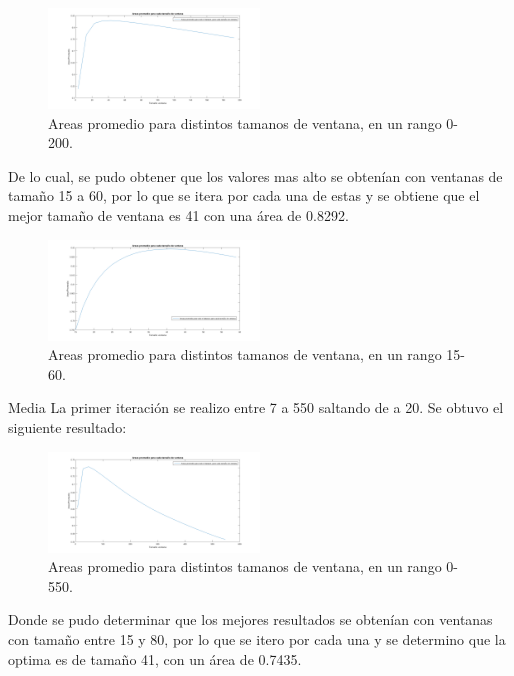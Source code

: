 \begin{figure}[h]
	{
	\centering
	\includegraphics[width=0.50\textwidth]{Figures/MedianaRangoGrande}
	\caption[An Electron]{Areas promedio para distintos tamanos de ventana, en un rango 0-200.}
	}
\end{figure}	

De lo cual, se pudo obtener que los valores mas alto se obtenían con ventanas de tamaño 15 a 60, por lo que se itera por cada una de estas y se obtiene que el mejor tamaño de ventana es 41 con una área de 0.8292.

	\begin{figure}[h]
	{
	\centering
	\includegraphics[width=0.50\textwidth]{Figures/MedianaRangoChico}
	\caption[An Electron]{Areas promedio para distintos tamanos de ventana, en un rango 15-60.}
	}
	\end{figure}	

Media 
La primer iteración se realizo entre 7 a 550 saltando de a 20. Se obtuvo el siguiente resultado:

\begin{figure}[h]
	{
	\centering
	\includegraphics[width=0.50\textwidth]{Figures/MediaRangoGrande}
	\caption[An Electron]{Areas promedio para distintos tamanos de ventana, en un rango 0-550.}
	}
\end{figure}

Donde se pudo determinar que los mejores resultados se obtenían con ventanas con tamaño entre 15 y 80, por lo que se itero por cada una y se determino que la optima es de tamaño 41, con un área de 0.7435.

